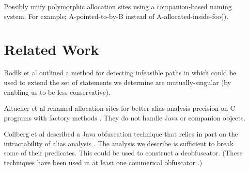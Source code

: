 \documentclass[11pt,notitlepage]{article}
\begin{document}
Possibly unify polymorphic allocation sites using a companion-based
naming system.  For example; A-pointed-to-by-B instead of
A-allocated-inside-foo().

\section{Related Work}

Bod{\'\i}k et al outlined a method for detecting infeasible paths
in \cite{267921} which could be used to extend the set of statements
we determine are mutually-singular (by enabling us to be less conservative).

Altucher et al renamed allocation sites for better alias analysis
precision on C programs with factory methods \cite{199466}.  They
do not handle Java or companion objects.

Collberg et al described a Java obfuscation technique that relies in
part on the intractability of alias analysis \cite{268962}.  The
analysis we describe is sufficient to break some of their predicates.
This could be used to construct a deobfuscator.  (These techniques
have been used in at least one commerical obfuscator \cite{humper02}.)



\end{document}
